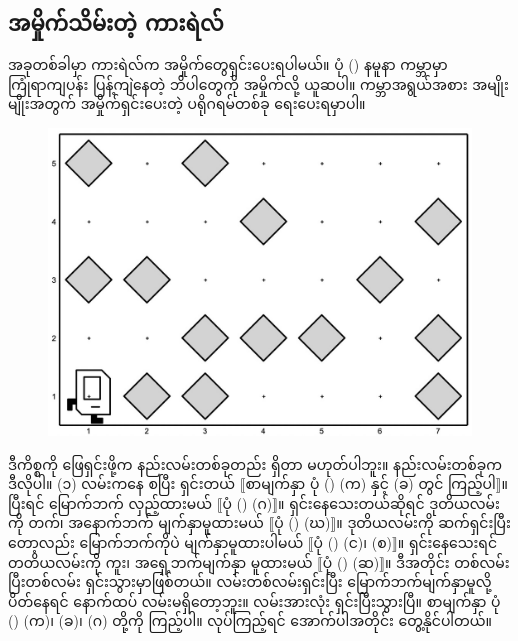 \subsection*{အမှိုက်သိမ်းတဲ့ ကားရဲလ်}
အခုတစ်ခါမှာ ကားရဲလ်က အမှိုက်တွေရှင်းပေးရပါမယ်။ ပုံ (\fRefNo{\ref{fig:stw}}) နမူနာ ကမ္ဘာမှာ ကြုံရာကျပန်း  ပြန့်ကျဲနေတဲ့ ဘိပါတွေကို အမှိုက်လို့ ယူဆပါ။  ကမ္ဘာအရွယ်အစား အမျိုးမျိုးအတွက် အမှိုက်ရှင်းပေးတဲ့ ပရိုဂရမ်တစ်ခု ရေးပေးရမှာပါ။
\begin{figure}[htb!]
    {\includegraphics[width=.5\linewidth]{images/ch03/clean_the_world/init_w1.jpg}}
\caption{}
\label{fig:stw}
\end{figure}

ဒီကိစ္စကို ဖြေရှင်းဖို့က နည်းလမ်းတစ်ခုတည်း ရှိတာ မဟုတ်ပါဘူး။ နည်းလမ်းတစ်ခုက ဒီလိုပါ။ (၁) လမ်းကနေ စပြီး ရှင်းတယ် $\big\llbracket$စာမျက်နှာ \fRefNo{\pageref{fig:stw_alg1}} ပုံ (\fRefNo{\ref{fig:stw_alg1}}) (က) နှင့် (ခ) တွင် ကြည့်ပါ$\big\rrbracket$။ ပြီးရင် မြောက်ဘက် လှည့်ထားမယ် $\big\llbracket$ပုံ (\fRefNo{\ref{fig:stw_alg1}}) (ဂ)$\big\rrbracket$။ ရှင်းနေသေးတယ်ဆိုရင် ဒုတိယလမ်းကို တက်၊ အနောက်ဘက် မျက်နှာမူထားမယ် $\big\llbracket$ပုံ (\fRefNo{\ref{fig:stw_alg1}}) (ဃ)$\big\rrbracket$။ ဒုတိယလမ်းကို ဆက်ရှင်းပြီးတော့လည်း မြောက်ဘက်ကိုပဲ မျက်နှာမူထားပါမယ် $\big\llbracket$ပုံ (\fRefNo{\ref{fig:stw_alg1}}) (င)၊ (စ)$\big\rrbracket$။ ရှင်းနေသေးရင် တတိယလမ်းကို ကူး၊ အရှေ့ဘက်မျက်နှာ မူထားမယ် $\big\llbracket$ပုံ (\fRefNo{\ref{fig:stw_alg1}}) (ဆ)$\big\rrbracket$။ ဒီအတိုင်း တစ်လမ်းပြီးတစ်လမ်း ရှင်းသွားမှာဖြစ်တယ်။ လမ်းတစ်လမ်းရှင်းပြီး မြောက်ဘက်မျက်နှာမူလို့ ပိတ်နေရင် နောက်ထပ် လမ်းမရှိတော့ဘူး။ လမ်းအားလုံး ရှင်းပြီးသွားပြီ။ စာမျက်နှာ \fRefNo{\pageref{fig:stw_alg1_last_st}} ပုံ (\fRefNo{\ref{fig:stw_alg1_last_st}}) (က)၊ (ခ)၊ (ဂ) တို့ကို ကြည့်ပါ။  လုပ်ကြည့်ရင် အောက်ပါအတိုင်း တွေ့နိုင်ပါတယ်။ 

